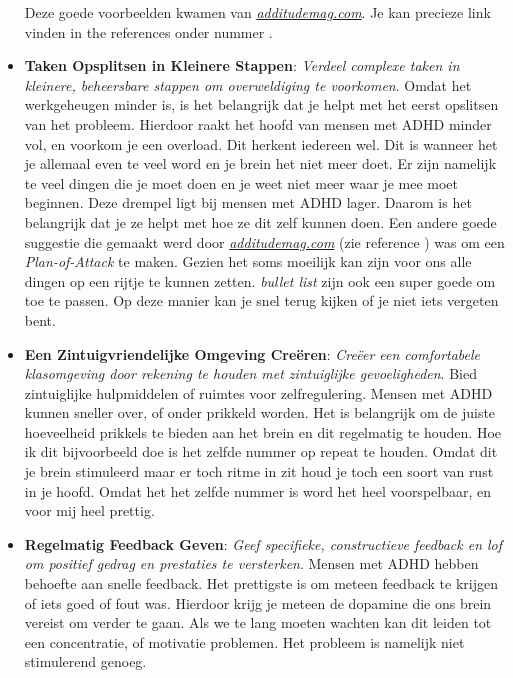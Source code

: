 \documentclass{article}
\begin{document}
\begin{itemize}
                        Deze goede voorbeelden kwamen van \emph{\hyperlink{https://www.additudemag.com/visual-learner-homework-help/}{additudemag.com}}. Je kan precieze link vinden in the references onder nummer \cite{ADHD-visual}.
                    \item \textbf{Taken Opsplitsen in Kleinere Stappen}: 
                        \textit{Verdeel complexe taken in kleinere, beheersbare stappen om overweldiging te voorkomen}. Omdat het werkgeheugen minder is, is het belangrijk dat je helpt met het eerst opslitsen van het probleem. Hierdoor raakt het hoofd van mensen met ADHD minder vol, en voorkom je een overload. Dit herkent iedereen wel. Dit is wanneer het je allemaal even te veel word en je brein het niet meer doet. Er zijn namelijk te veel dingen die je moet doen en je weet niet meer waar je mee moet beginnen. Deze drempel ligt bij mensen met ADHD lager. Daarom is het belangrijk dat je ze helpt met hoe ze dit zelf kunnen doen.
                        \smallskip
                        Een andere goede suggestie die gemaakt werd door \emph{\hyperlink{https://www.additudemag.com/visual-learner-homework-help/}{additudemag.com}} (zie reference \cite{ADHD-visual}) was om een \textit{Plan-of-Attack} te maken. Gezien het soms moeilijk kan zijn voor ons alle dingen op een rijtje te kunnen zetten. \textit{bullet list} zijn ook een super goede om toe te passen. Op deze manier kan je snel terug kijken of je niet iets vergeten bent.
                    \item \textbf{Een Zintuigvriendelijke Omgeving Creëren}: 
                        \textit{Creëer een comfortabele klasomgeving door rekening te houden met zintuiglijke gevoeligheden}. Bied zintuiglijke hulpmiddelen of ruimtes voor zelfregulering. Mensen met ADHD kunnen sneller over, of onder prikkeld worden. Het is belangrijk om de juiste hoeveelheid prikkels te bieden aan het brein en dit regelmatig te houden. Hoe ik dit bijvoorbeeld doe is het zelfde nummer op repeat te houden. Omdat dit je brein stimuleerd maar er toch ritme in zit houd je toch een soort van rust in je hoofd. Omdat het het zelfde nummer is word het heel voorspelbaar, en voor mij heel prettig.
                    \item \textbf{Regelmatig Feedback Geven}: 
                        \textit{Geef specifieke, constructieve feedback en lof om positief gedrag en prestaties te versterken}. Mensen met ADHD hebben behoefte aan snelle feedback. Het prettigste is om meteen feedback te krijgen of iets goed of fout was. Hierdoor krijg je meteen de dopamine die ons brein vereist om verder te gaan. Als we te lang moeten wachten kan dit leiden tot een concentratie, of motivatie problemen. Het probleem is namelijk niet stimulerend genoeg.
                \end{itemize}
            
\end{document}
